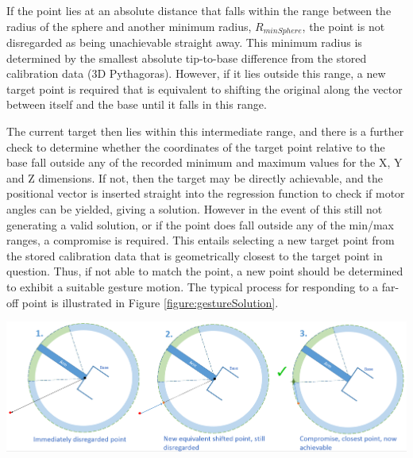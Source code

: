 \documentclass[11pt]{article}
\begin{document}
If the point lies at an absolute distance that falls within the range between the radius of the sphere and another minimum radius, $R_{minSphere}$, the point is not disregarded as being unachievable straight away. This minimum radius is determined by the smallest absolute tip-to-base difference from the stored calibration data (3D Pythagoras). However, if it lies outside this range, a new target point is required that is equivalent to shifting the original along the vector between itself and the base until it falls in this range. 

The current target then lies within this intermediate range, and there is a further check to determine whether the coordinates of the target point relative to the base fall outside any of the recorded minimum and maximum values for the X, Y and Z dimensions. If not, then the target may be directly achievable, and the positional vector is inserted straight into the regression function to check if motor angles can be yielded, giving a solution. However in the event of this still not generating a valid solution, or if the point does fall outside any of the min/max ranges, a compromise is required. This entails selecting a new target point from the stored calibration data that is geometrically closest to the target point in question. Thus, if not able to match the point, a new point should be determined to exhibit a suitable gesture motion. The typical process for responding to a far-off point is illustrated in Figure \ref{figure:gestureSolution}.

\begin{center}
\includegraphics[width=\textwidth]{images/gestureSolution.png}
\label{figure:gestureSolution}
\end{center}
\end{document}
